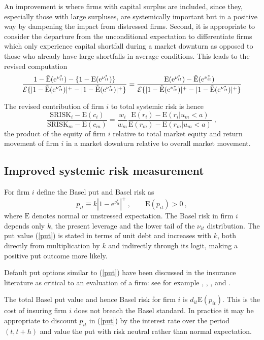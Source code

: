 \documentclass[authoryear]{elsarticle}
\newcommand{\E}{\mathrm{E}}
\newcommand{\e}{\mathrm{e}}
\newcommand{\Ex}{{\cal E}}
\newcommand{\eref}[1]{(\ref{#1})}
\newcommand{\cq}{\ , \qquad}
\newcommand{\be}[1]{\begin{equation}\label{#1}}
\newcommand{\ee}{\end{equation}}
\begin{document}
An improvement is where firms with capital surplus are included, since they, especially those with large surpluses, are systemically important but in a positive way by dampening the impact from distressed firms.  Second, it is  appropriate to consider the departure from the unconditional expectation to differentiate firms which only experience capital shortfall during a market downturn as opposed to those who already have large shortfalls in average conditions.   This leads to the revised computation
$$
\frac{1-\Es(\e^{\nu^*_{it}})-\{1-\E(\e^{\nu^*_{it}})\}}{\Ex\{|1-\Es(\e^{\nu^*_{it}})|^+-|1-\Es(\e^{\nu^*_{it}})|^+\}} = \frac{\E(\e^{\nu^*_{it}})-\Es(\e^{\nu^*_{it}})}{\Ex\{|1-\Es(\e^{\nu^*_{it}})|^+-|1-\Es(\e^{\nu^*_{it}})|^+\}} 
$$


The revised contribution of firm $i$ to total systemic risk is hence
$$
\frac{\mathrm{SRISK}_i-\E(c_i)}{\mathrm{SRISK}_m-\E(c_m)}
=\frac{w_i }{w_m } \frac{\E(r_i)-\E(r_i|u_m<a)}{\E(r_m)-\E(r_m|u_m<a)} \;,
$$
the product of the equity of firm $i$ relative to total market equity and return movement of firm $i$ in a market downturn relative to overall market movement.



\subsection{Improved systemic risk measurement}

For  firm $i$ define the  Basel put and  Basel risk as 
\be{put}
p_{it}\equiv k |1-\e^{\nu^*_{it}}|^+\cq \E(p_{it})>0\ ,
\ee
where $\E$ denotes normal or unstressed expectation.  The Basel risk in firm $i$ depends only $k$,  the present leverage  and the lower tail of the  $\nu_{it}$ distribution.  The put value \eref{put} is stated in terms of unit debt and increases with $k$, both directly from  multiplication by $k$ and indirectly through its logit, making a positive put outcome more likely.  

Default put options similar to \eref{put} have been discussed in the insurance literature as critical to an evaluation of a firm:  see for
example \citet{merton1977analytic}, \citet{doherty1986price}, \citet{cummins1988risk}, \citet{myers2001capital} and \citet{sherris2006solvency}.

The total Basel put value and hence Basel risk for firm  $i$ is   $d_{it}\E(p_{it})$.   This is the cost of insuring firm $i$ does not breach the Basel standard.  In practice it may be appropriate to discount $p_{it}$ in \eref{put} by the interest rate over the period $(t,t+h)$ and value the put with risk neutral rather than normal expectation.       
\end{document}
